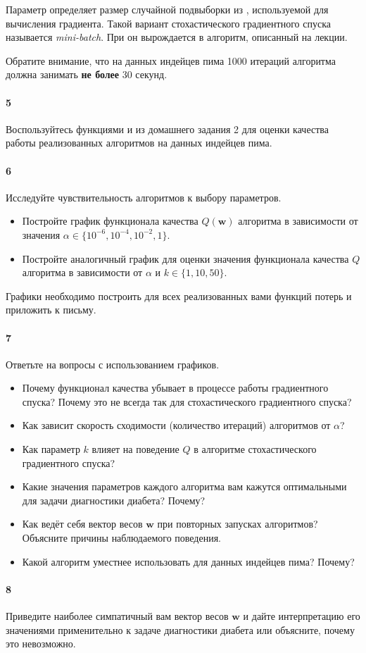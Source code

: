 \documentclass[a4paper,12pt]{article}
\begin{document}
Параметр  определяет размер случайной подвыборки из
, используемой для вычисления градиента. Такой вариант
стохастического градиентного спуска называется \emph{mini-batch}. При
 он вырождается в алгоритм, описанный на лекции.

Обратите внимание, что на данных индейцев пима 1000 итераций алгоритма должна
занимать \textbf{не более} 30 секунд.

\paragraph{5} Воспользуйтесь функциями  и
 из домашнего задания 2 для оценки качества
работы реализованных алгоритмов на данных индейцев пима.

\paragraph{6} Исследуйте чувствительность алгоритмов к выбору параметров.

\begin{itemize}
\item Постройте график функционала качества $Q(\mathbf{w})$ алгоритма
   в зависимости от значения $\alpha \in
  \{10^{-6}, 10^{-4}, 10^{-2}, 1\}$.
\item Постройте аналогичный график для оценки значения функционала качества $Q$
  алгоритма  в зависимости от $\alpha$ и $k \in \{1, 10,
  50\}$.
\end{itemize}

Графики необходимо построить для всех реализованных вами функций потерь и
приложить к письму.

\paragraph{7} Ответьте на вопросы с использованием графиков.
\begin{itemize}
\item Почему функционал качества убывает в процессе работы градиентного
  спуска? Почему это не всегда так для стохастического градиентного спуска?
\item Как зависит скорость сходимости (количество итераций) алгоритмов от $\alpha$?
\item Как параметр $k$ влияет на поведение $Q$ в алгоритме стохастического
  градиентного спуска?
\item Какие значения параметров каждого алгоритма вам кажутся оптимальными для
  задачи диагностики диабета? Почему?
\item Как ведёт себя вектор весов $\mathbf{w}$ при повторных запусках
  алгоритмов? Объясните причины наблюдаемого поведения.
\item Какой алгоритм уместнее использовать для данных индейцев пима? Почему?
\end{itemize}

\paragraph{8} Приведите наиболее симпатичный вам вектор весов $\mathbf{w}$ и
дайте интерпретацию его значениями применительно к задаче диагностики диабета
или объясните, почему это невозможно.
\end{document}
